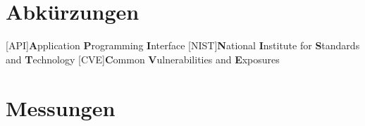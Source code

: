\documentclass[10pt,a4paper,twoside]{article}
\begin{document}
    \newpage

    
    \newpage
    
    \newpage
    
    \newpage
    
    \newpage
    
    \newpage
    
    \newpage
    
    \newpage
     


    \newpage
    \begin{appendices}
        \section{Abkürzungen} \label{sec:Abkürzungen}
        \begin{acronym}[LangesWortFuerDieEinstellung]
            [API]{\textbf{A}pplication \textbf{P}rogramming \textbf{I}nterface}
            [NIST]{\textbf{N}ational \textbf{I}nstitute for \textbf{S}tandards and \textbf{T}echnology}
            [CVE]{\textbf{C}ommon \textbf{V}ulnerabilities and \textbf{E}xposures}
        \end{acronym}
        \section{Messungen} \label{sec:Messungen}
    \end{appendices}

    \newpage
    \printbibheading[title={Quellen}]
    \printbibliography[type=book, heading=subbibliography, title={Literatur}]

    \newpage
    \listoffigures
    \newpage
    \listoftables
\end{document}
